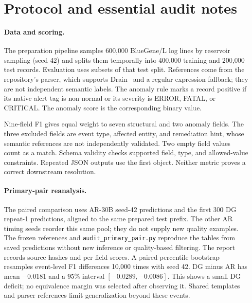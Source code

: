 \section{Protocol and essential audit notes}
\label{app:protocol}

\paragraph{Data and scoring.}
The preparation pipeline samples 600,000 BlueGene/L log lines by reservoir
sampling (seed 42) and splits them temporally into 400,000 training and
200,000 test records. Evaluation uses subsets of that test split. References
come from the repository's parser, which supports Drain~\cite{drain} and
a regular-expression fallback; they are not independent semantic labels.
The anomaly rule marks a record positive if its native alert tag is
non-normal or its severity is ERROR, FATAL, or CRITICAL. The anomaly score
is the corresponding binary value.

Nine-field F1 gives equal weight to seven structural and two anomaly fields.
The three excluded fields are event type, affected entity, and remediation
hint, whose semantic references are not independently validated. Two empty
field values count as a match. Schema validity checks supported field,
type, and allowed-value constraints. Repeated JSON outputs use the first
object. Neither metric proves a correct downstream resolution.

\paragraph{Primary-pair reanalysis.}
The paired comparison uses AR-30B seed-42 predictions and the first 300
DG repeat-1 predictions, aligned to the same prepared test prefix. The
other AR timing seeds reorder this same pool; they do not supply new
quality examples. The frozen references and \texttt{audit\_primary\_pair.py}
reproduce the tables from saved predictions without new inference or
quality-based filtering. The report records source hashes and per-field scores.
A paired percentile bootstrap resamples event-level F1 differences 10,000
times with seed 42. DG minus AR has mean $-0.0181$ and a 95\% interval
$[-0.0289,-0.0086]$. This shows a small DG deficit; no equivalence margin
was selected after observing it. Shared templates and parser references
limit generalization beyond these events.

